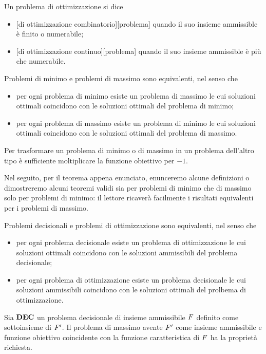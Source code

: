 \begin{Definition}
	Un problema di ottimizzazione si dice
	\begin{itemize}
		\item {}[di ottimizzazione combinatorio][problema] quando il suo insieme ammissible \`e finito o numerabile;
		\item {}[di ottimizzazione continuo][problema] quando il suo insieme ammissible \`e pi\`u che numerabile.
	\end{itemize}
\end{Definition}
\begin{Theorem}
	Problemi di minimo e problemi di massimo sono equivalenti, nel senso che
	\begin{itemize}
		\item per ogni problema di minimo esiste un problema di massimo le cui soluzioni ottimali coincidono con le soluzioni ottimali del problema di minimo;
		\item per ogni problema di massimo esiste un problema di minimo le cui soluzioni ottimali coincidono con le soluzioni ottimali del problema di massimo.
	\end{itemize}
\end{Theorem}
\Proof Per trasformare un problema di minimo o di massimo in un problema dell'altro tipo \`e sufficiente moltiplicare la funzione obiettivo per $-1$. \EndProof
\par Nel seguito, per il teorema appena enunciato, enunceremo alcune definizioni o dimostreremo alcuni teoremi validi sia per problemi di minimo che di massimo solo per problemi di minimo: il lettore ricaver\`a facilmente i risultati equivalenti per i problemi di massimo.
\begin{Theorem}
	Problemi decisionali e problemi di ottimizzazione sono equivalenti, nel senso che
	\begin{itemize}
		\item per ogni problema decisionale esiste un problema di ottimizzazione le cui soluzioni ottimali coincidono con le soluzioni ammissibili del problema decisionale;
		\item per ogni problema di ottimizzazione esiste un problema decisionale le cui soluzioni ammissibili coincidono con le soluzioni ottimali del prolbema di ottimizzazione.
	\end{itemize}
\end{Theorem}
\Proof Sia $\textbf{DEC}$ un problema decisionale di insieme ammissibile $F$ definito come sottoinsieme di $F'$. Il problema di massimo avente $F'$ come insieme ammissibile e funzione obiettivo coincidente con la funzione caratteristica di $F$ ha la propriet\`a richiesta.
